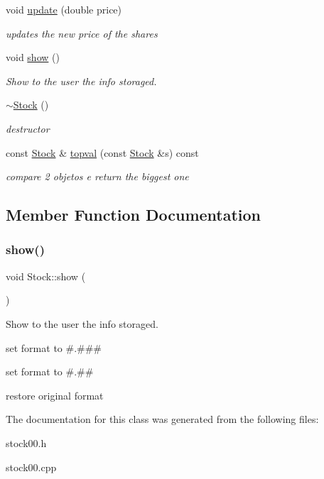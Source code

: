 \begin{DoxyCompactItemize}
\mbox{\label{classStock_a3e7ceda99d3fc2279b1ce74957671746}} 
void \hyperlink{classStock_a3e7ceda99d3fc2279b1ce74957671746}{update} (double price)
\begin{DoxyCompactList}\small\item\em updates the new price of the shares \end{DoxyCompactList}\item 
void \hyperlink{classStock_afa604579a5754070f666468e9ba950c4}{show} ()
\begin{DoxyCompactList}\small\item\em Show to the user the info storaged. \end{DoxyCompactList}\item 
\mbox{\label{classStock_a29cb9e4fc7c907ef975d7ea90ef55e24}} 
\hyperlink{classStock_a29cb9e4fc7c907ef975d7ea90ef55e24}{$\sim$\+Stock} ()
\begin{DoxyCompactList}\small\item\em destructor \end{DoxyCompactList}\item 
\mbox{\label{classStock_a060ea42aebd5ade3b822eeb5abe8e5a0}} 
const \hyperlink{classStock}{Stock} \& \hyperlink{classStock_a060ea42aebd5ade3b822eeb5abe8e5a0}{topval} (const \hyperlink{classStock}{Stock} \&s) const
\begin{DoxyCompactList}\small\item\em compare 2 objetos e return the biggest one \end{DoxyCompactList}\end{DoxyCompactItemize}


\subsection{Member Function Documentation}
\mbox{\label{classStock_afa604579a5754070f666468e9ba950c4}} 
\subsubsection{\texorpdfstring{show()}{show()}}
{\footnotesize\ttfamily void Stock\+::show (\begin{DoxyParamCaption}{ }\end{DoxyParamCaption})}



Show to the user the info storaged. 

set format to \#.\#\#\#

set format to \#.\#\#

restore original format 

The documentation for this class was generated from the following files\+:\begin{DoxyCompactItemize}
\item 
stock00.\+h\item 
stock00.\+cpp\end{DoxyCompactItemize}
